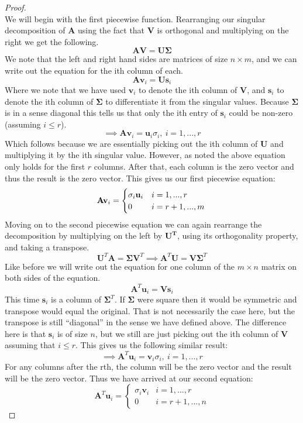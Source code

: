 \documentclass[]{article}
\begin{document}
	\begin{proof}~\\
		We will begin with the first piecewise function. Rearranging our singular decomposition of $\mathbf{A}$ using the fact that $\mathbf{V}$ is orthogonal and multiplying on the right we get the following.
		\[\mathbf{AV}=\mathbf{U\Sigma}\]
		We note that the left and right hand sides are matrices of size $n\times m$, and we can write out the equation for the ith column of each.
		\[\mathbf{Av}_i=\mathbf{Us}_i\]
		Where we note that we have used $\mathbf{v}_i$ to denote the ith column of $\mathbf{V}$, and $\mathbf{s}_i$ to denote the ith column of $\mathbf{\Sigma}$ to differentiate it from the singular values. Because $\mathbf{\Sigma}$ is in a sense diagonal this tells us that only the ith entry of $\mathbf{s}_i$ could be non-zero (assuming $i\leq r$).
		\[\implies \mathbf{Av}_i = \mathbf{u}_i\sigma_i,\:i=1,...,r\]
		Which follows because we are essentially picking out the ith column of $\mathbf{U}$ and multiplying it by the ith singular value. However, as noted the above equation only holds for the first $r$ columns. After that, each column is the zero vector and thus the result is the zero vector. This gives us our first piecewise equation:
		\[\mathbf{A}\mathbf{v}_i=
		\begin{cases}
		\sigma_i\mathbf{u}_i & i=1,...,r\\
		0 & i=r+1,...,m	
		\end{cases}\\\]
		Moving on to the second piecewise equation we can again rearrange the decomposition by multiplying on the left by $\mathbf{U^T}$, using its orthogonality property, and taking a transpose.
		\[\mathbf{U}^T\mathbf{A} = \mathbf{\Sigma V}^T \implies \mathbf{A}^T\mathbf{U} = \mathbf{V\Sigma}^T\]
		Like before we will write out the equation for one column of the $m\times n$ matrix on both sides of the equation.
		\[\mathbf{A}^T\mathbf{u}_i=\mathbf{Vs}_i\]
		This time $\mathbf{s}_i$ is a column of $\mathbf{\Sigma}^T$. If $\mathbf{\Sigma}$ were square then it would be symmetric and transpose would equal the original. That is not necessarily the case here, but the transpose is still ``diagonal'' in the sense we have defined above. The difference here is that $\mathbf{s}_i$ is of size $n$, but we still are just picking out the ith column of $\mathbf{V}$ assuming that $i\leq r$. This gives us the following similar result:
		\[\implies \mathbf{A}^T\mathbf{u}_i = \mathbf{v}_i\sigma_i,\:i=1,...,r\]
		For any columns after the rth, the column will be the zero vector and the result will be the zero vector. Thus we have arrived at our second equation:
		\[\mathbf{A}^T\mathbf{u}_i=
		\begin{cases}
		\sigma_i\mathbf{v}_i & i=1,...,r\\
		0 & i=r+1,...,n	
		\end{cases}\]
	\end{proof}
	\newpage
\end{document}
